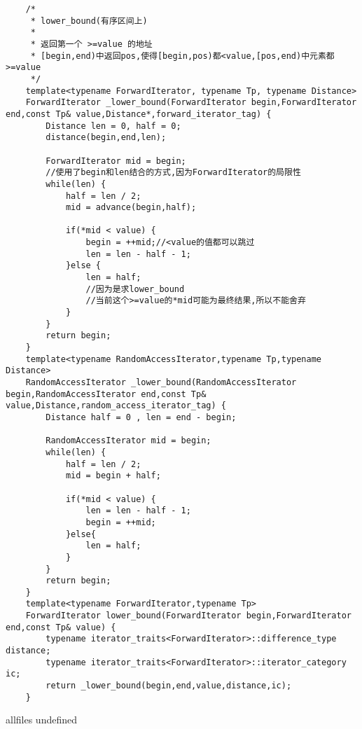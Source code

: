 \documentclass[a4paper,10pt]{article}
\begin{document}
\begin{CJK}{UTF8}{gbsn}     %

\else

\begin{lstlisting}
	/*
	 * lower_bound(有序区间上)
	 *
	 * 返回第一个 >=value 的地址
	 * [begin,end)中返回pos,使得[begin,pos)都<value,[pos,end)中元素都>=value
	 */
	template<typename ForwardIterator, typename Tp, typename Distance>
	ForwardIterator _lower_bound(ForwardIterator begin,ForwardIterator end,const Tp& value,Distance*,forward_iterator_tag) {
		Distance len = 0, half = 0;
		distance(begin,end,len);

		ForwardIterator mid = begin;
		//使用了begin和len结合的方式,因为ForwardIterator的局限性
		while(len) {
			half = len / 2;
			mid = advance(begin,half);

			if(*mid < value) {
				begin = ++mid;//<value的值都可以跳过
				len = len - half - 1;
			}else {
				len = half;
				//因为是求lower_bound
				//当前这个>=value的*mid可能为最终结果,所以不能舍弃
			}
		}
		return begin;
	}
	template<typename RandomAccessIterator,typename Tp,typename Distance>
	RandomAccessIterator _lower_bound(RandomAccessIterator begin,RandomAccessIterator end,const Tp& value,Distance,random_access_iterator_tag) {
		Distance half = 0 , len = end - begin;

		RandomAccessIterator mid = begin;
		while(len) {
			half = len / 2;
			mid = begin + half;

			if(*mid < value) {
				len = len - half - 1;
				begin = ++mid;
			}else{
				len = half;
			}
		}
		return begin;
	}
	template<typename ForwardIterator,typename Tp>
	ForwardIterator lower_bound(ForwardIterator begin,ForwardIterator end,const Tp& value) {
		typename iterator_traits<ForwardIterator>::difference_type distance;
		typename iterator_traits<ForwardIterator>::iterator_category ic;
		return _lower_bound(begin,end,value,distance,ic);
	}
\end{lstlisting}
\fi

\ifx allfiles undefined
\end{CJK}
\end{document}

